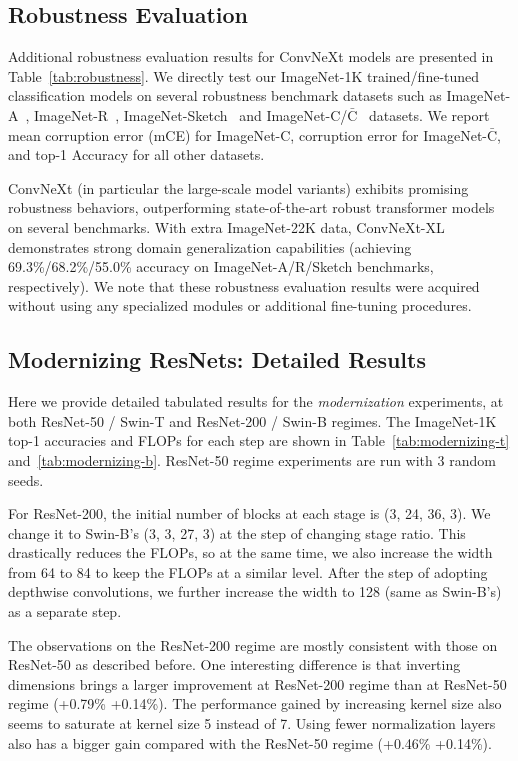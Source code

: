 \subsection{Robustness Evaluation}
\label{sec:robustness}
Additional robustness evaluation results for ConvNeXt models are presented in Table~\ref{tab:robustness}. We directly test our ImageNet-1K trained/fine-tuned classification models on several robustness benchmark datasets such as ImageNet-A~\cite{hendrycks2021natural}, ImageNet-R~\cite{hendrycks2021many}, ImageNet-Sketch~\cite{wang2019learning} and ImageNet-C/$\bar{\text{C}}$~\cite{hendrycks2018benchmarking, mintun2021interaction} datasets. We report mean corruption error (mCE) for ImageNet-C, corruption error for ImageNet-$\bar{\text{C}}$, and top-1 Accuracy for all other datasets. 

ConvNeXt (in particular the large-scale model variants) exhibits promising robustness behaviors, outperforming state-of-the-art robust transformer models~\cite{mao2021towards} on several benchmarks. With extra ImageNet-22K data, ConvNeXt-XL demonstrates strong domain generalization capabilities (\eg achieving 69.3\%/68.2\%/55.0\% accuracy on ImageNet-A/R/Sketch benchmarks, respectively). We note that these robustness evaluation results were acquired without using any specialized modules or additional fine-tuning procedures.
 


\subsection{Modernizing ResNets: Detailed Results}
\label{sec:modernizing_result}
Here we provide detailed tabulated results for the \emph{modernization} experiments, at both ResNet-50 / Swin-T and ResNet-200 / Swin-B regimes. The ImageNet-1K top-1 accuracies and FLOPs for each step are shown in Table~\ref{tab:modernizing-t} and~\ref{tab:modernizing-b}. ResNet-50 regime experiments are run with 3 random seeds.

For ResNet-200, the initial number of blocks at each stage is (3, 24, 36, 3). We change it to Swin-B's (3, 3, 27, 3) at the step of changing stage ratio. This drastically reduces the FLOPs, so at the same time, we also increase the width from 64 to 84 to keep the FLOPs at a similar level. After the step of adopting depthwise convolutions, we further increase the width to 128 (same as Swin-B's) as a separate step. 

The observations on the ResNet-200 regime are mostly consistent with those on ResNet-50 as described before. One interesting difference is that inverting dimensions brings a larger improvement at ResNet-200 regime than at ResNet-50 regime (+0.79\% \vs +0.14\%). The performance gained by increasing kernel size also seems to saturate at kernel size 5 instead of 7. Using fewer normalization layers also has a bigger gain compared with the ResNet-50 regime (+0.46\% \vs +0.14\%).




